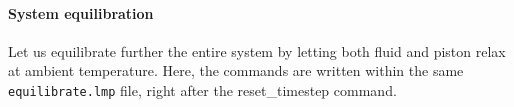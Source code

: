 \documentclass[9pt,tutorial]{livecoms}
\newcommand{\lmpcmd}[1]{\hspace{0pt}\colorbox{listing}{\textcolor{command}{\small{#1}}}\hspace{0pt}} %
\newcommand{\flecmd}[1]{\textcolor{command}{\texttt{#1}}} %
\begin{document}







\paragraph{System equilibration}

Let us equilibrate further the entire system by letting both fluid and piston
relax at ambient temperature.  Here, the commands are written within the same
\flecmd{equilibrate.lmp} file, right after the \lmpcmd{reset\_timestep} command.
\end{document}
